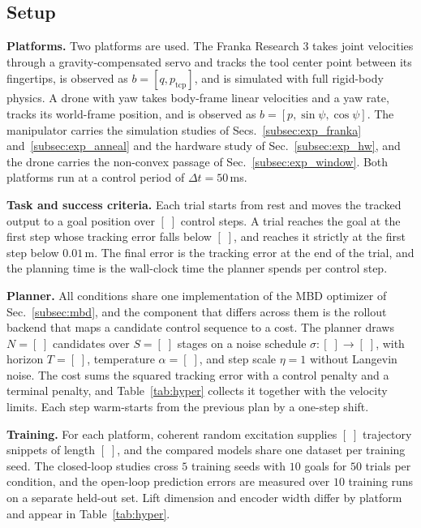 \documentclass[letterpaper,10pt,conference]{ieeeconf}
\begin{document}
\subsection{Setup}\label{subsec:setup}

\textbf{Platforms.}
Two platforms are used.
The Franka Research 3 takes joint velocities through a gravity-compensated servo and tracks the tool center point between its fingertips, is observed as $b = [q, p_{\mathrm{tcp}}]$, and is simulated with full rigid-body physics.
A drone with yaw takes body-frame linear velocities and a yaw rate, tracks its world-frame position, and is observed as $b = [p, \sin\psi, \cos\psi]$.
The manipulator carries the simulation studies of Secs.~\ref{subsec:exp_franka} and~\ref{subsec:exp_anneal} and the hardware study of Sec.~\ref{subsec:exp_hw}, and the drone carries the non-convex passage of Sec.~\ref{subsec:exp_window}.
Both platforms run at a control period of $\Delta t = 50$\,ms.

\textbf{Task and success criteria.}
Each trial starts from rest and moves the tracked output to a goal position over $[\;]$ control steps.
A trial reaches the goal at the first step whose tracking error falls below $[\;]$, and reaches it strictly at the first step below $0.01$\,m.
The final error is the tracking error at the end of the trial, and the planning time is the wall-clock time the planner spends per control step.

\textbf{Planner.}
All conditions share one implementation of the MBD optimizer of Sec.~\ref{subsec:mbd}, and the component that differs across them is the rollout backend that maps a candidate control sequence to a cost.
The planner draws $N = [\;]$ candidates over $S = [\;]$ stages on a noise schedule $\sigma\!: [\;] \to [\;]$, with horizon $T = [\;]$, temperature $\alpha = [\;]$, and step scale $\eta = 1$ without Langevin noise.
The cost sums the squared tracking error with a control penalty and a terminal penalty, and Table~\ref{tab:hyper} collects it together with the velocity limits.
Each step warm-starts from the previous plan by a one-step shift.

\textbf{Training.}
For each platform, coherent random excitation supplies $[\;]$ trajectory snippets of length $[\;]$, and the compared models share one dataset per training seed.
The closed-loop studies cross $5$ training seeds with $10$ goals for $50$ trials per condition, and the open-loop prediction errors are measured over $10$ training runs on a separate held-out set.
Lift dimension and encoder width differ by platform and appear in Table~\ref{tab:hyper}.
\end{document}

